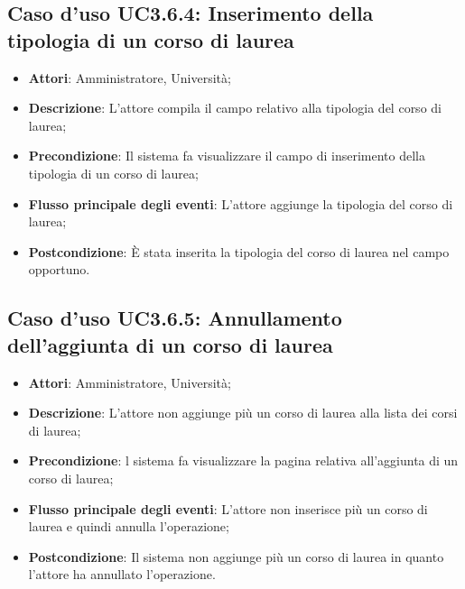 \subsection{Caso d'uso \texorpdfstring{UC3.6.4}{UC3.6.4}: Inserimento della tipologia di un corso di laurea}
\begin{itemize}
	\item \textbf{Attori}: Amministratore, Università;
	\item \textbf{Descrizione}: L'attore compila il campo relativo alla tipologia del corso di laurea;
	\item \textbf{Precondizione}: Il sistema fa visualizzare il campo di inserimento della tipologia di un corso di laurea;
	\item \textbf{Flusso principale degli eventi}: L'attore aggiunge la tipologia del corso di laurea;
	\item \textbf{Postcondizione}: È stata inserita la tipologia del corso di laurea nel campo opportuno.
\end{itemize}
\subsection{Caso d'uso \texorpdfstring{UC3.6.5}{UC3.6.5}: Annullamento dell'aggiunta di un corso di laurea}
\begin{itemize}
	\item \textbf{Attori}: Amministratore, Università;
	\item \textbf{Descrizione}: L'attore non aggiunge più un corso di laurea alla lista dei corsi di laurea;
	
	\item \textbf{Precondizione}: l sistema fa visualizzare la pagina relativa all'aggiunta di un corso di laurea;
	
	\item \textbf{Flusso principale degli eventi}: L'attore non inserisce più un corso di laurea e quindi annulla l'operazione;
	
	\item \textbf{Postcondizione}: Il sistema non aggiunge più un corso di laurea in quanto l'attore ha annullato l'operazione.
	
\end{itemize}
